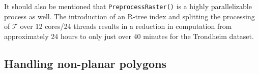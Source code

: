 It should also be mentioned that \texttt{PreprocessRaster()} is a highly parallelizable process as well.
The introduction of an R-tree index and splitting the processing of $\mathcal{T}$ over 12 cores/24 threads results in a reduction in computation from approximately 24 hours to only just over 40 minutes for the Trondheim dataset.

\subsection{Handling non-planar polygons}%
\label{sec:non-planar-fix}

